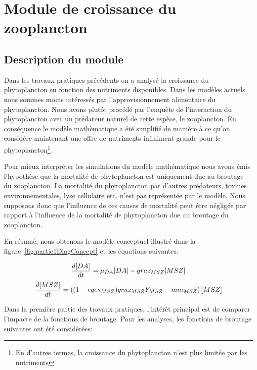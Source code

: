 \section{Module de croissance du zooplancton}

\subsection{Description du module}
\par{
Dans les travaux pratiques précédents on a analysé la croissance du phytoplancton en fonction des
nutriments disponibles. Dans les modèles actuels nous sommes moins intéressés par l'approvisionnement
alimentaire du phytoplancton. Nous avons plutôt procédé par l'enquête de l'interaction du phytoplancton avec
un prédateur naturel de cette espèce, le zooplancton. En conséquence le modèle mathèmatique a été simplifié
de manière à ce qu'on considère maintenant une offre de nutriments infiniment grande pour le
phytoplancton\footnote{En d'autres termes, la croissance du phytoplancton n'est plus limitée par les
nutriments}.
\par{
Pour mieux interpréter les simulations du modèle mathématique nous avons émis l'hypothèse que la mortalité
de phytoplancton est uniquement due au broutage du zooplancton. La mortalité du phytoplancton par d'autres
prédateurs, toxines environnementales, lyse cellulaire etc. n'est pas représentée par le modèle.
Nous supposons donc que l'influence de ces causes de mortalité peut être négligée par rapport à l'influence
de la mortalité de phytoplancton due au broutage du zooplancton.
}
\par{
En résumé, nous obtenons le modèle conceptuel illustré dans la figure~\ref{fig:partie1DiagConcept}
et les équations suivantes:
}

\begin{equation}
  {{d[DA]}\over{dt}} =
  \mu_{DA} [DA] - graz_{MSZ} [MSZ]
  \label{eq:partie1DiffEq1}
\end{equation}
\begin{equation}
  {{d[MSZ]}\over{dt}} =
  \left (
    (1- eges_{MSZ}) graz_{MSZ} Y_{MSZ} - mm_{MSZ}
  \right ) [MSZ]
  \label{eq:partie1DiffEq2}
\end{equation}

\par{
Dans la première partie des travaux pratiques, l'intérêt principal est de comparer l'impacte de la
fonctions de broutage. Pour les analyses, les fonctions de broutage suivantes ont été considérées:
}

}
